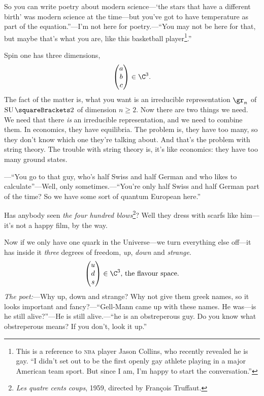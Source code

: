 \documentclass[10pt, a4paper, twoside]{lecturenotes}
\begin{document}
So you can write poetry about modern science---`the stars that have a different birth' was modern science at the time---but you've got to have temperature as part of the equation.''---I'm not here for poetry.---``You may not be here for that, but maybe that's what you are, like this basketball player\footnote{This is a reference to \textsc{nba} player Jason Collins, who recently revealed he is gay. ``I didn't set out to be the first openly gay athlete playing in a major American team sport. But since I am, I'm happy to start the conversation.''}.''

Spin one has three dimensions,\[
\begin{pmatrix}
a\\ b\\ c
\end{pmatrix}\in\C^3\text.
\] The fact of the matter is, what you want is an irreducible representation $\gr_n$ of $\SpecialUnitaryGroup\of 2$ of dimension $n\geq 2$. Now there are two things we need. We need that there \emph{is} an irreducible representation, and we need to combine them. In economics, they have equilibria. The problem is, they have too many, so they don't know which one they're talking about. And that's the problem with string theory. The trouble with string theory is, it's like economics: they have too many ground states.

---``You go to that guy, who's half Swiss and half German and who likes to calculate''---Well, only sometimes.---``You're only half Swiss and half German part of the time? So we have some sort of quantum European here.'' 

Has anybody seen \emph{the four hundred blows}\footnote{\emph{Les quatre cents coups}, 1959, directed by François Truffaut.}? Well they dress with scarfs like him---it's not a happy film, by the way.

Now if we only have one quark in the Universe---we turn everything else off---it has inside it \emph{three} degrees of freedom, \emph{up}, \emph{down} and \emph{strange}.
\[
\begin{pmatrix}
u\\ d\\ s
\end{pmatrix}\in \C^3 \text{, the flavour space.}
\]
\emph{The poet:}---Why up, down and strange? Why not give them greek names, so it looks important and fancy?---``Gell-Mann came up with these names. He was---is he still alive?''---He is still alive.---``he is an obstreperous guy. Do you know what obstreperous means? If you don't, look it up.'' 
\end{document}
